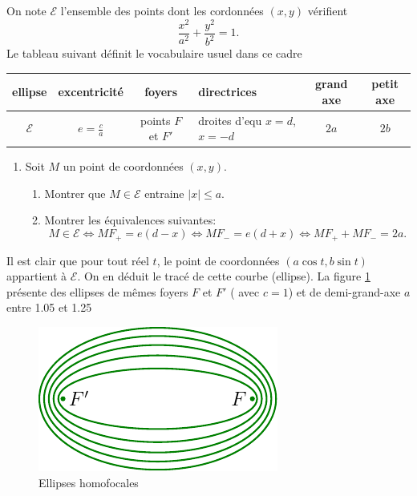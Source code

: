 On note $\mathcal{E}$ l'ensemble des points dont les cordonnées $(x,y)$ vérifient 
\[
  \frac{x^2}{a^2} + \frac{y^2}{b^2} = 1 .
\]
Le tableau suivant définit le vocabulaire usuel dans ce cadre
\begin{center}
\renewcommand{\arraystretch}{1.3}
\begin{tabular}{|c|c|c|p{2cm}|c|c|}\hline
ellipse       & excentricité    & foyers             & \centering directrices                                      & grand axe & petit axe\\ \hline
$\mathcal{E}$ & $e=\frac{c}{a}$ & points $F$ et $F'$ & \centering droites d'equ \newline $x = d$,\newline $x = -d$ & $2a$      & $2b$ \\ \hline
\end{tabular}
\end{center}

\begin{enumerate}
  \setcounter{enumi}{\value{numquestion}}
  \item Soit $M$ un point de coordonnées $(x,y)$.
  \begin{enumerate}
    \item Montrer que $M\in \mathcal{E}$ entraine $|x| \leq a$.
    \item Montrer les équivalences suivantes:
\[
  M\in \mathcal{E}
  \Leftrightarrow MF_+ = e(d-x) \Leftrightarrow MF_- = e(d+x) \Leftrightarrow MF_+ + MF_- = 2a.
\]
  \end{enumerate}
  \setcounter{numquestion}{\value{enumi}}
\end{enumerate}
Il est clair que pour tout réel $t$, le point de coordonnées $(a\cos t, b\sin t)$ appartient à $\mathcal{E}$. On en déduit le tracé de cette courbe (ellipse).\newline
La figure \ref{fig:disqell_1} présente des ellipses de mêmes foyers $F$ et $F'$ ( avec $c = 1$) et de demi-grand-axe $a$ entre 1.05 et 1.25
\begin{figure}[h!]
  \centering
  \includegraphics{Edisqell_1.pdf}
  \caption{Ellipses homofocales}
  \label{fig:disqell_1}
\end{figure}

